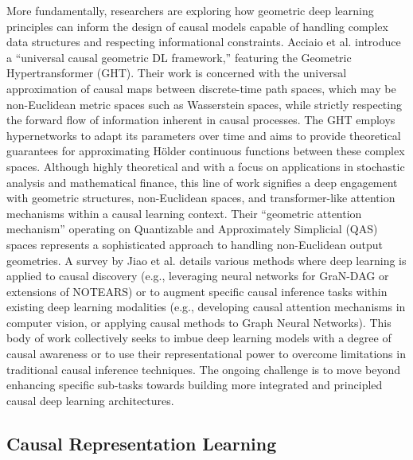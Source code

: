 {More fundamentally, researchers are exploring how geometric deep learning principles can inform the design of causal models capable of handling complex data structures and respecting informational constraints. Acciaio et al. \cite{acciaio2024designing} introduce a ``universal causal geometric DL framework,'' featuring the Geometric Hypertransformer (GHT). Their work is concerned with the universal approximation of causal maps between discrete-time path spaces, which may be non-Euclidean metric spaces such as Wasserstein spaces, while strictly respecting the forward flow of information inherent in causal processes. The GHT employs hypernetworks to adapt its parameters over time and aims to provide theoretical guarantees for approximating Hölder continuous functions between these complex spaces. Although highly theoretical and with a focus on applications in stochastic analysis and mathematical finance, this line of work signifies a deep engagement with geometric structures, non-Euclidean spaces, and transformer-like attention mechanisms within a causal learning context. Their ``geometric attention mechanism'' operating on Quantizable and Approximately Simplicial (QAS) spaces represents a sophisticated approach to handling non-Euclidean output geometries. A survey by Jiao et al. \cite{jiao2024causal} details various methods where deep learning is applied to causal discovery (e.g., leveraging neural networks for GraN-DAG or extensions of NOTEARS) or to augment specific causal inference tasks within existing deep learning modalities (e.g., developing causal attention mechanisms in computer vision, or applying causal methods to Graph Neural Networks). This body of work collectively seeks to imbue deep learning models with a degree of causal awareness or to use their representational power to overcome limitations in traditional causal inference techniques. The ongoing challenge is to move beyond enhancing specific sub-tasks towards building more integrated and principled causal deep learning architectures.

\subsection{Causal Representation Learning}

}
